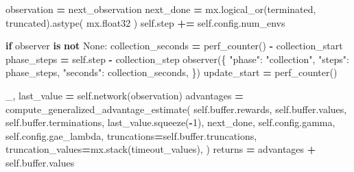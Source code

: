 \documentclass[
  american,
  11pt,
  letterpaper,
]{article}
\newenvironment{Shaded}{\begin{snugshade}}{\end{snugshade}}
\newcommand{\BuiltInTok}[1]{#1}
\newcommand{\ControlFlowTok}[1]{\textcolor[rgb]{0.13,0.29,0.53}{\textbf{#1}}}
\newcommand{\DecValTok}[1]{\textcolor[rgb]{0.00,0.00,0.81}{#1}}
\newcommand{\KeywordTok}[1]{\textcolor[rgb]{0.13,0.29,0.53}{\textbf{#1}}}
\newcommand{\NormalTok}[1]{#1}
\newcommand{\OperatorTok}[1]{\textcolor[rgb]{0.81,0.36,0.00}{\textbf{#1}}}
\newcommand{\StringTok}[1]{\textcolor[rgb]{0.31,0.60,0.02}{#1}}
\newcommand{\VariableTok}[1]{\textcolor[rgb]{0.00,0.00,0.00}{#1}}
\renewenvironment{Shaded}{\par\smallskip}{\par\smallskip}
\begin{document}
\begin{Shaded}
\begin{Highlighting}[]
\NormalTok{                observation }\OperatorTok{=}\NormalTok{ next\_observation}
\NormalTok{                next\_done }\OperatorTok{=}\NormalTok{ mx.logical\_or(terminated, truncated).astype(}
\NormalTok{                    mx.float32}
\NormalTok{                )}
                \VariableTok{self}\NormalTok{.step }\OperatorTok{+=} \VariableTok{self}\NormalTok{.config.num\_envs}

            \ControlFlowTok{if}\NormalTok{ observer }\KeywordTok{is} \KeywordTok{not} \VariableTok{None}\NormalTok{:}
\NormalTok{                collection\_seconds }\OperatorTok{=}\NormalTok{ perf\_counter() }\OperatorTok{{-}}\NormalTok{ collection\_start}
\NormalTok{                phase\_steps }\OperatorTok{=} \VariableTok{self}\NormalTok{.step }\OperatorTok{{-}}\NormalTok{ collection\_step}
\NormalTok{                observer(\{}
                    \StringTok{"phase"}\NormalTok{: }\StringTok{"collection"}\NormalTok{,}
                    \StringTok{"steps"}\NormalTok{: phase\_steps,}
                    \StringTok{"seconds"}\NormalTok{: collection\_seconds,}
\NormalTok{                \})}
\NormalTok{                update\_start }\OperatorTok{=}\NormalTok{ perf\_counter()}

\NormalTok{            \_, last\_value }\OperatorTok{=} \VariableTok{self}\NormalTok{.network(observation)}
\NormalTok{            advantages }\OperatorTok{=}\NormalTok{ compute\_generalized\_advantage\_estimate(}
                \VariableTok{self}\NormalTok{.}\BuiltInTok{buffer}\NormalTok{.rewards,}
                \VariableTok{self}\NormalTok{.}\BuiltInTok{buffer}\NormalTok{.values,}
                \VariableTok{self}\NormalTok{.}\BuiltInTok{buffer}\NormalTok{.terminations,}
\NormalTok{                last\_value.squeeze(}\OperatorTok{{-}}\DecValTok{1}\NormalTok{),}
\NormalTok{                next\_done,}
                \VariableTok{self}\NormalTok{.config.gamma,}
                \VariableTok{self}\NormalTok{.config.gae\_lambda,}
\NormalTok{                truncations}\OperatorTok{=}\VariableTok{self}\NormalTok{.}\BuiltInTok{buffer}\NormalTok{.truncations,}
\NormalTok{                truncation\_values}\OperatorTok{=}\NormalTok{mx.stack(timeout\_values),}
\NormalTok{            )}
\NormalTok{            returns }\OperatorTok{=}\NormalTok{ advantages }\OperatorTok{+} \VariableTok{self}\NormalTok{.}\BuiltInTok{buffer}\NormalTok{.values}


\end{Highlighting}
\end{Shaded}
\end{document}
